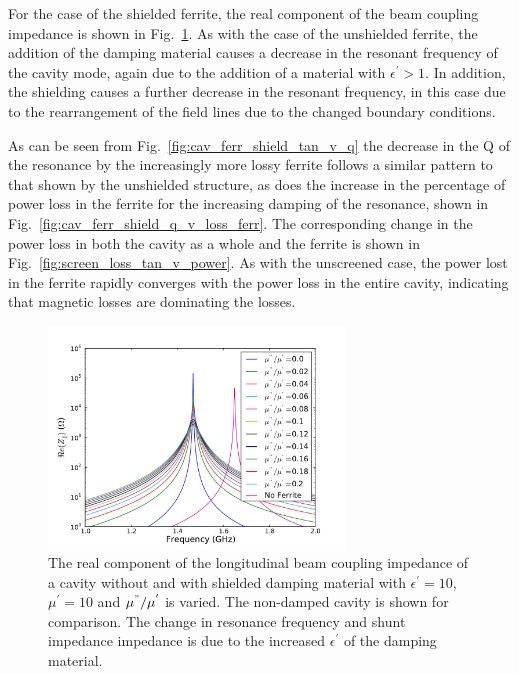 For the case of the shielded ferrite, the real component of the beam coupling impedance is shown in Fig.~\ref{fig:screen_long_imp}. As with the case of the unshielded ferrite, the addition of the damping material causes a decrease in the resonant frequency of the cavity mode, again due to the addition of a material with $\epsilon^{'} > 1$. In addition, the shielding causes a further decrease in the resonant frequency, in this case due to the rearrangement of the field lines due to the changed boundary conditions.

As can be seen from Fig.~\ref{fig:cav_ferr_shield_tan_v_q} the decrease in the Q of the resonance by the increasingly more lossy ferrite follows a similar pattern to that shown by the unshielded structure, as does the increase in the percentage of power loss in the ferrite for the increasing damping of the resonance, shown in Fig.~\ref{fig:cav_ferr_shield_q_v_loss_ferr}. The corresponding change in the power loss in both the cavity as a whole and the ferrite is shown in Fig.~\ref{fig:screen_loss_tan_v_power}. As with the unscreened case, the power lost in the ferrite rapidly converges with the power loss in the entire cavity, indicating that magnetic losses are dominating the losses.	

\begin{figure}
\begin{center}
\includegraphics[width=0.7\textwidth]{Beam_Coupling_Impedance_Reduction_Techniques/figures/screen_long_imp_all.pdf}
\end{center}
\caption{The real component of the longitudinal beam coupling impedance of a cavity without and with shielded damping material with $\epsilon^{'}=10$, $\mu^{'}=10$ and $\mu^{"}/\mu^{'}$ is varied. The non-damped cavity is shown for comparison. The change in resonance frequency and shunt impedance impedance is due to the increased $\epsilon^{'}$ of the damping material.}
\label{fig:screen_long_imp}
\end{figure}


